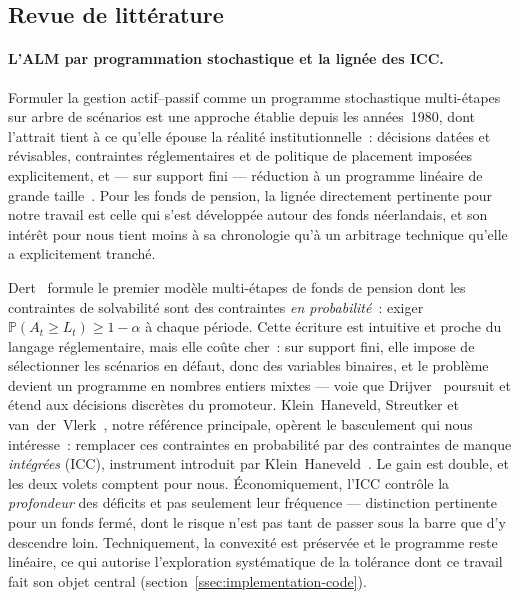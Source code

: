 \documentclass[11pt,letterpaper]{article}
\newcommand{\prob}{\mathbb{P}}
\theoremstyle{definition}
\begin{document}
\subsection{Revue de littérature}\label{ssec:revue}

\paragraph{L'ALM par programmation stochastique et la lignée des ICC.}
Formuler la gestion actif--passif comme un programme stochastique multi-étapes
sur arbre de scénarios est une approche établie depuis les années~1980, dont
l'attrait tient à ce qu'elle épouse la réalité institutionnelle~: décisions
datées et révisables, contraintes réglementaires et de politique de placement
imposées explicitement, et --- sur support fini --- réduction à un programme
linéaire de grande taille~\cite[chap.~1--3]{KHvdVR2020}. Pour les fonds de
pension, la lignée directement pertinente pour notre travail est celle qui
s'est développée autour des fonds néerlandais, et son intérêt pour nous tient
moins à sa chronologie qu'à un arbitrage technique qu'elle a explicitement
tranché.

Dert~\cite{Dert1995} formule le premier modèle multi-étapes de fonds de
pension dont les contraintes de solvabilité sont des contraintes \emph{en
probabilité}~: exiger $\prob(A_t \ge L_t) \ge 1-\alpha$ à chaque période.
Cette écriture est intuitive et proche du langage réglementaire, mais elle
coûte cher~: sur support fini, elle impose de sélectionner les scénarios en
défaut, donc des variables binaires, et le problème devient un programme en
nombres entiers mixtes --- voie que Drijver~\cite{Drijver2005} poursuit et
étend aux décisions discrètes du promoteur. Klein~Haneveld, Streutker et
van~der~Vlerk~\cite{KHSV2010}, notre référence principale, opèrent le
basculement qui nous intéresse~: remplacer ces contraintes en probabilité par
des contraintes de manque \emph{intégrées} (ICC), instrument introduit par
Klein~Haneveld~\cite{KH1986}. Le gain est double, et les deux volets comptent
pour nous. Économiquement, l'ICC contrôle la \emph{profondeur} des déficits et
pas seulement leur fréquence --- distinction pertinente pour un fonds fermé,
dont le risque n'est pas tant de passer sous la barre que d'y descendre
loin. Techniquement, la convexité est préservée et le programme reste
linéaire, ce qui autorise l'exploration systématique de la tolérance dont ce
travail fait son objet central (section~\ref{ssec:implementation-code}).
\end{document}

